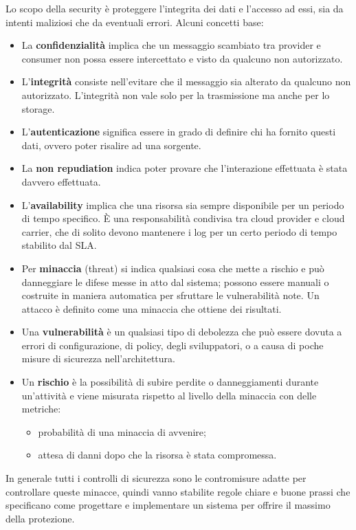 Lo scopo della security è proteggere l'integrita dei dati e l'accesso ad essi, sia da intenti maliziosi che da eventuali errori. Alcuni concetti base:
\begin{itemize}
    \item La \textbf{confidenzialità} implica che un messaggio scambiato tra provider e consumer non possa essere intercettato e visto da qualcuno non autorizzato.
    \item L'\textbf{integrità} consiste nell'evitare che il messaggio sia alterato da qualcuno non autorizzato. L'integrità non vale solo per la trasmissione ma anche per lo storage.
    \item L'\textbf{autenticazione} significa essere in grado di definire chi ha fornito questi dati, ovvero poter risalire ad una sorgente.
    \item La \textbf{non repudiation} indica poter provare che l'interazione effettuata è stata davvero effettuata.
    \item L'\textbf{availability} implica che una risorsa sia sempre disponibile per un periodo di tempo specifico. È una responsabilità condivisa tra cloud provider e cloud carrier, che di solito devono mantenere i log per un certo periodo di tempo stabilito dal SLA.
    \item Per \textbf{minaccia} (threat) si indica qualsiasi cosa che mette a rischio e può danneggiare le difese messe in atto dal sistema; possono essere manuali o costruite in maniera automatica per sfruttare le vulnerabilità note. Un attacco è definito come una minaccia che ottiene dei risultati.
    \item Una \textbf{vulnerabilità} è un qualsiasi tipo di debolezza che può essere dovuta a errori di configurazione, di policy, degli sviluppatori, o a causa di poche misure di sicurezza nell'architettura.
    \item Un \textbf{rischio} è la possibilità di subire perdite o danneggiamenti durante un'attività e viene misurata rispetto al livello della minaccia con delle metriche:
    \begin{itemize}
        \item probabilità di una minaccia di avvenire;
        \item attesa di danni dopo che la risorsa è stata compromessa.
    \end{itemize}
\end{itemize}
In generale tutti i controlli di sicurezza sono le contromisure adatte per controllare queste minacce, quindi vanno stabilite regole chiare e buone prassi che specificano come progettare e implementare un sistema per offrire il massimo della protezione.

